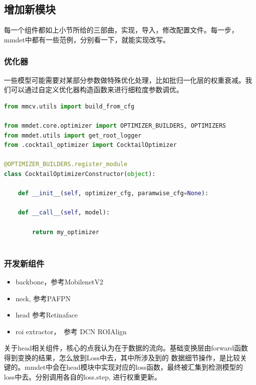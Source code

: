 \documentclass[UTF8]{ctexart}
\begin{document}
\subsection{增加新模块}
每一个组件都如上小节所给的三部曲，实现，导入，修改配置文件。每一步，mmdet中都有一些范例，分别看一下，就能实现改写。

\subsubsection{优化器}

一些模型可能需要对某部分参数做特殊优化处理，比如批归一化层的权重衰减。我们可以通过自定义优化器构造函数来进行细粒度参数调优。
\lstset{style=mystyle}
\begin{lstlisting}[language=Python]
from mmcv.utils import build_from_cfg

from mmdet.core.optimizer import OPTIMIZER_BUILDERS, OPTIMIZERS
from mmdet.utils import get_root_logger
from .cocktail_optimizer import CocktailOptimizer

@OPTIMIZER_BUILDERS.register_module
class CocktailOptimizerConstructor(object):

	def __init__(self, optimizer_cfg, paramwise_cfg=None):

	def __call__(self, model):

		return my_optimizer
	
\end{lstlisting}


\subsubsection{开发新组件}

\begin{itemize}
	\item backbone，参考MobilenetV2
	\item neck, 参考PAFPN
	\item head 参考Retinaface
	\item roi extractor，　参考 DCN ROIAlign
\end{itemize}

关于head相关组件，核心的点我认为在于数据的流向。基础变换层由forward函数得到变换的结果，怎么放到Loss中去，其中所涉及到的
数据细节操作，是比较关键的。mmdet中会在head模块中实现对应的loss函数，最终被汇集到检测模型的loss中去。分别调用各自的loss.step, 进行权重更新。
\end{document}
